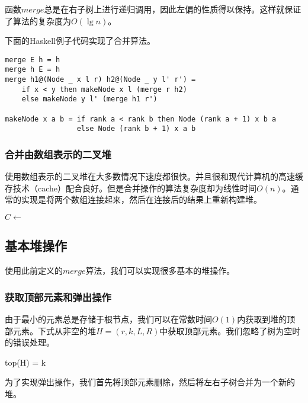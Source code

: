 \documentclass[UTF8]{article}
\begin{document}
函数$merge$总是在右子树上进行递归调用，因此左偏的性质得以保持。这样就保证了算法的复杂度为$O(\lg n)$。

下面的Haskell例子代码实现了合并算法。

\lstset{language=Haskell}
\begin{lstlisting}[style=Haskell]
merge E h = h
merge h E = h
merge h1@(Node _ x l r) h2@(Node _ y l' r') =
    if x < y then makeNode x l (merge r h2)
    else makeNode y l' (merge h1 r')

makeNode x a b = if rank a < rank b then Node (rank a + 1) x b a
                 else Node (rank b + 1) x a b
\end{lstlisting}

\subsubsection{合并由数组表示的二叉堆}

使用数组表示的二叉堆在大多数情况下速度都很快。并且很和现代计算机的高速缓存技术（cache）配合良好。但是合并操作的算法复杂度却为线性时间$O(n)$。通常的实现是将两个数组连接起来，然后在连接后的结果上重新构建堆\cite{NIST}。

\begin{algorithmic}[1]
  \State $C \gets$ 
  \State {}
\EndFunction
\end{algorithmic}

\subsection{基本堆操作}

使用此前定义的$merge$算法，我们可以实现很多基本的堆操作。

\subsubsection{获取顶部元素和弹出操作}

由于最小的元素总是存储于根节点，我们可以在常数时间$O(1)$内获取到堆的顶部元素。下式从非空的堆$H = (r, k, L, R)$中获取顶部元素。我们忽略了树为空时的错误处理。

\be
top(H) = k
\ee

为了实现弹出操作，我们首先将顶部元素删除，然后将左右子树合并为一个新的堆。
\end{document}
